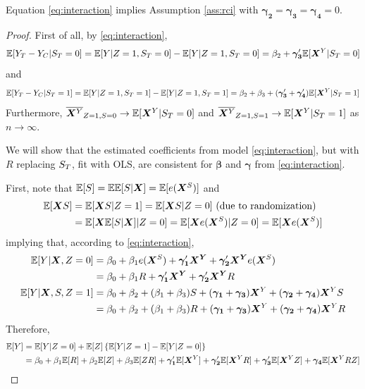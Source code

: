 \documentclass{statsoc} %
\begin{document}
Equation \eqref{eq:interaction} implies Assumption \ref{ass:rci} with $\bm{\gamma_2}=\bm{\gamma_3}=\bm{\gamma_4}=0$. 

\begin{proof}
First of all, by \eqref{eq:interaction}, 
\begin{equation*}
  \mathbb{E}[Y_T-Y_C|S_T=0]=\mathbb{E}[Y|Z=1,S_T=0]-\mathbb{E}[Y|Z=1,S_T=0]=\beta_2+\bm{\gamma_3}'\mathbb{E}[\bm{X}^Y|S_T=0]
\end{equation*}
and
\begin{equation*}
  \mathbb{E}[Y_T-Y_C|S_T=1]=\mathbb{E}[Y|Z=1,S_T=1]-\mathbb{E}[Y|Z=1,S_T=1]=\beta_2+\beta_3+(\bm{\gamma_3}'+\bm{\gamma_4}')\mathbb{E}[\bm{X}^Y|S_T=1]
\end{equation*}
Furthermore, $\overline{\bm{X}^Y}_{Z=1,S=0}\rightarrow \mathbb{E}[\bm{X}^Y|S_T=0]$ and $\overline{\bm{X}^Y}_{Z=1,S=1}\rightarrow \mathbb{E}[\bm{X}^Y|S_T=1]$ as $n\rightarrow \infty$.

We will show that the estimated coefficients from model \eqref{eq:interaction}, but with $R$ replacing $S_T$, fit with OLS, are consistent for $\bm{\beta}$ and $\bm{\gamma}$ from \eqref{eq:interaction}. 

First, note that $\mathbb{E}[S]=\mathbb{E}\mathbb{E}[S|\bm{X}]=\mathbb{E}[e(\bm{X}^S)]$ and
\begin{align*}
  \mathbb{E}[\bm{X} S]&=\mathbb{E}[\bm{X} S|Z=1]=\mathbb{E}[\bm{X} S|Z=0] \mbox{ (due to randomization)}\\
  &=\mathbb{E}[\bm{X}\mathbb{E}[S|\bm{X}]|Z=0]=\mathbb{E}[\bm{X}e(\bm{X}^S)|Z=0]=\mathbb{E}[\bm{X}e(\bm{X}^S)]
\end{align*}
implying that, according to \eqref{eq:interaction},
\begin{equation*}
  \begin{split}
    \mathbb{E}[Y|\bm{X},Z=0]&=\beta_0+\beta_1e(\bm{X}^S)+\bm{\gamma_1}'\bm{X^Y}+\bm{\gamma_2}'\bm{X^Y}e(\bm{X}^S)\\
                  &=\beta_0+\beta_1R+\bm{\gamma_1}'\bm{X^Y}+\bm{\gamma_2}'\bm{X^Y}R\\
    \mathbb{E}[Y|\bm{X},S,Z=1]&=\beta_0+\beta_2+(\beta_1+\beta_3)S+(\bm{\gamma_1}+\bm{\gamma_3})\bm{X}^Y+(\bm{\gamma_2}+\bm{\gamma_4})\bm{X}^Y S\\
    &=\beta_0+\beta_2+(\beta_1+\beta_3)R+(\bm{\gamma_1}+\bm{\gamma_3})\bm{X}^Y+(\bm{\gamma_2}+\bm{\gamma_4})\bm{X}^Y R
  \end{split}
\end{equation*}
Therefore,
\begin{align*}
  \mathbb{E}[Y]&=\mathbb{E}[Y|Z=0]+\mathbb{E}[Z]\left\{\mathbb{E}[Y|Z=1]-\mathbb{E}[Y|Z=0]\right\}\\
  &=\beta_0+\beta_1\mathbb{E}[R]+\beta_2\mathbb{E}[Z]+\beta_3\mathbb{E}[ZR]+\bm{\gamma_1}'\mathbb{E}[\bm{X}^Y]+\bm{\gamma_2}'\mathbb{E}[\bm{X}^Y R]+\bm{\gamma_3}'\mathbb{E}[\bm{X}^Y Z]+\bm{\gamma_4}\mathbb{E}[\bm{X}^Y RZ]
\end{align*}
  

\end{proof}
\end{document}
